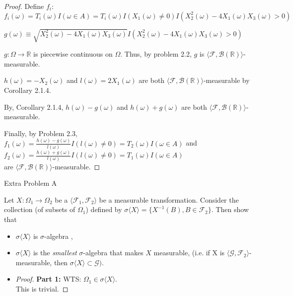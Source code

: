 \documentclass[12pt,letterpaper, onecolumn]{exam}
\newcommand{\real}{\mathbb{R}}
\newcommand{\salg}{$\sigma$-algebra }
\newcommand{\calF}{\mathcal{F}}
\newcommand{\calG}{\mathcal{G}}
\newcommand{\gensig}[1]{\sigma\langle #1 \rangle} %
\newcommand{\tribrac}[1]{\langle #1 \rangle}
\newcommand{\borel}{\mathcal{B}(\mathbb{R})}
\begin{document}
\begin{questions}
\begin{solution}
\begin{itemize}
\begin{proof}
            Define $f_i$:
            \[f_i(\omega) = T_i(\omega) I(\omega \in A) = T_i(\omega)I(X_1(\omega) \neq 0) I(X_2^2(\omega) - 4 X_1(\omega) X_3(\omega) > 0)\]

           $g(\omega) \equiv \sqrt{X_2^2(\omega) - 4 X_1(\omega) X_3(\omega)} I(X_2^2(\omega) - 4 X_1(\omega) X_3(\omega) > 0)$

           $g: \Omega \to \real$ is piecewise continuous on $\Omega$. Thus, by problem 2.2, $g$ is $\tribrac{\calF, \borel}$-measurable. 

           $h(\omega) = -X_2(\omega)$ and $l(\omega) = 2X_1(\omega)$ are both $\tribrac{\calF, \borel}$-measurable by Corollary 2.1.4.

           By, Corollary 2.1.4, $h(\omega) - g(\omega)$ and $h(\omega) + g(\omega)$ are both $\tribrac{\calF, \borel}$-measurable.

           Finally, by Problem 2.3, \\$f_1(\omega) = \frac{h(\omega) - g(\omega)}{l(\omega)}I(l(\omega) \neq 0) = T_2(\omega) I(\omega \in A)$ and \\
           $f_2(\omega) = \frac{h(\omega) + g(\omega)}{l(\omega)}I(l(\omega) \neq 0) = T_1(\omega) I(\omega \in A)$ \\
           are $\tribrac{\calF, \borel}$-measurable.
            \end{proof}
        \end{itemize}
    \end{solution}

    \question Extra Problem A

    Let $X: \Omega_1 \to \Omega_2$ be a $\tribrac{\calF_1, \calF_2}$ be a measurable transformation. Consider the collection (of subsets of $\Omega_1$) defined by $\gensig{X} = \{X^{-1}(B), B \in \calF_2\}$. Then show that
    \begin{itemize}
        \item[(a)] $\gensig{X}$ is \salg,
        \item[(b)] $\gensig{X}$ is the \textit{smallest} \salg that makes $X$ measurable, (i.e. if X is $\tribrac{\calG, \calF_2}$-measurable, then $\gensig{X} \subset \calG)$.
    \end{itemize}
    \begin{solution}
        \begin{itemize}
            \item[(a)] 
            \begin{proof}
                \textbf{Part 1:} WTS: $\Omega_1 \in \gensig{X}$. \\
                This is trivial. 


\end{proof}
\end{itemize}
\end{solution}
\end{questions}
\end{document}
